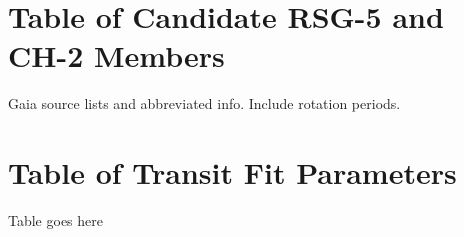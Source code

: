 \documentclass[12pt,twocolumn,linenumbers]{aastex63}
\begin{document}
% 
% 
% 
% 

\clearpage
                            
 

\appendix
\section{Table of Candidate RSG-5 and CH-2 Members}
\label{app:members}

Gaia source lists and abbreviated info.  Include rotation periods.

\section{Table of Transit Fit Parameters}
\label{app:transit}

Table goes here


\end{document}
